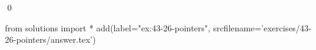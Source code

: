 
\begin{ex}
  \label{ex:43-26-pointers}
  
  \qed
\end{ex}
\begin{python0}
from solutions import *
add(label="ex:43-26-pointers",
    srcfilename='exercises/43-26-pointers/answer.tex')
\end{python0}

